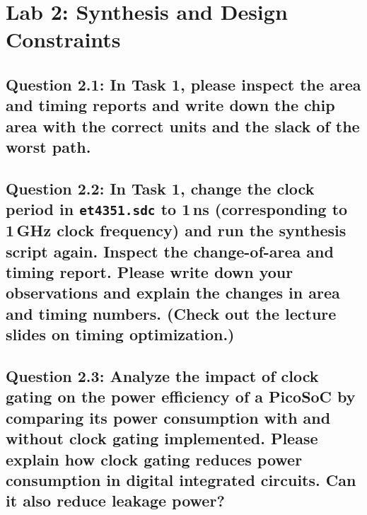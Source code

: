 \documentclass{article}
\begin{document}
\begin{tcolorbox}[colback=white, colframe=black, width=\textwidth, height=0.3\textheight, title=Answer 1.5]
\end{tcolorbox}

\newpage

\section{Lab 2: Synthesis and Design Constraints}

\subsection*{Question 2.1: In Task 1, please inspect the area and timing reports and write down the chip area with the correct units and the slack of the worst path.}

\begin{tcolorbox}[colback=white, colframe=black, width=\textwidth, height=0.3\textheight, title=Answer 2.1]
\end{tcolorbox}

\subsection*{Question 2.2: In Task 1, change the clock period in \texttt{et4351.sdc} to 1\,ns (corresponding to 1\,GHz clock frequency) and run the synthesis script again. Inspect the change-of-area and timing report. Please write down your observations and explain the changes in area and timing numbers. (Check out the lecture slides on timing optimization.)}

\begin{tcolorbox}[colback=white, colframe=black, width=\textwidth, height=0.4\textheight, title=Answer 2.2]
\end{tcolorbox}

\newpage
\subsection*{Question 2.3: Analyze the impact of clock gating on the power efficiency of a PicoSoC by comparing its power consumption with and without clock gating implemented. Please explain how clock gating reduces power consumption in digital integrated circuits. Can it also reduce leakage power?}
\end{document}
